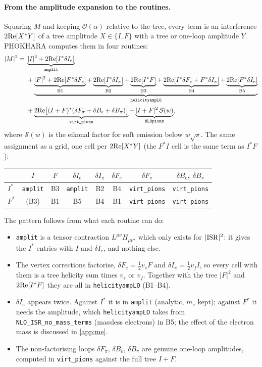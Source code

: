 \documentclass[11pt,a4paper]{article}
\newcommand{\code}[1]{\texttt{#1}}
\newcommand{\phok}{PHOKHARA}
\begin{document}
\paragraph{From the amplitude expansion to the routines.} Squaring $M$ and keeping
$\mathcal O(\alpha)$ relative to the tree, every term is an interference $2{\rm Re}[X^*Y]$ of a
tree amplitude $X\in\{I,F\}$ with a tree or one-loop amplitude $Y$. \phok{} computes them in
four routines:
\begin{align}
|M|^2 ={}& \underbrace{|I|^2+2{\rm Re}[I^*\delta I_e]}_{\code{amplit}}\notag\\[2pt]
&+\underbrace{\underbrace{|F|^2+2{\rm Re}[F^*\delta F_e]}_{\rm B1}
  +\underbrace{2{\rm Re}[I^*\delta I_\pi]}_{\rm B2}
  +\underbrace{2{\rm Re}[I^*F]}_{\rm B3}
  +\underbrace{2{\rm Re}[I^*\delta F_e+F^*\delta I_\pi]}_{\rm B4}
  +\underbrace{2{\rm Re}[F^*\delta I_e]}_{\rm B5}}_{\code{helicityampLO}}\notag\\[2pt]
&+\underbrace{2{\rm Re}\big[(I+F)^*(\delta F_\pi+\delta B_e+\delta B_\pi)\big]}_{\code{virt\_pions}}
 +\underbrace{|I+F|^2\,\mathcal S(w)}_{\code{NLOpions}},
\label{eq:phok-split}
\end{align}
where $\mathcal S(w)$ is the eikonal factor for soft emission below $w\sqrt s$. The same
assignment as a grid, one cell per $2{\rm Re}[X^*Y]$ (the $F^*I$ cell is the same term as $I^*F$):
\begin{center}\small
\begin{tabular}{@{}l|cc|cccc|c@{}}
\toprule
 & $I$ & $F$ & $\delta I_e$ & $\delta I_\pi$ & $\delta F_e$ & $\delta F_\pi$ & $\delta B_e$, $\delta B_\pi$ \\
\midrule
$I^*$ & \code{amplit} & B3 & \code{amplit} & B2 & B4 & \code{virt\_pions} & \code{virt\_pions} \\
$F^*$ & (B3) & B1 & B5 & B4 & B1 & \code{virt\_pions} & \code{virt\_pions} \\
\bottomrule
\end{tabular}
\end{center}
The pattern follows from what each routine can do:
\begin{itemize}
\item \code{amplit} is a tensor contraction $L^{\mu\nu}H_{\mu\nu}$, which only exists for
  $|{\rm ISR}|^2$: it gives the $I^*$ entries with $I$ and $\delta I_e$, and nothing else.
\item The vertex corrections factorise, $\delta F_e=\tfrac12v_sF$ and $\delta I_\pi=\tfrac12v_fI$,
  so every cell with them is a tree helicity sum times $v_s$ or $v_f$. Together with the tree
  $|F|^2$ and $2{\rm Re}[I^*F]$ they are all in \code{helicityampLO} (B1--B4).
\item $\delta I_e$ appears twice. Against $I^*$ it is in \code{amplit} (analytic, $m_e$ kept);
  against $F^*$ it needs the amplitude, which \code{helicityampLO} takes from
  \code{NLO\_ISR\_no\_mass\_terms} (massless electrons) in B5; the effect of the electron mass is discussed in \cref{app:me}.
\item The non-factorising loops $\delta F_\pi$, $\delta B_e$, $\delta B_\pi$ are genuine one-loop
  amplitudes, computed in \code{virt\_pions} against the full tree $I+F$.
\end{itemize}
\end{document}
